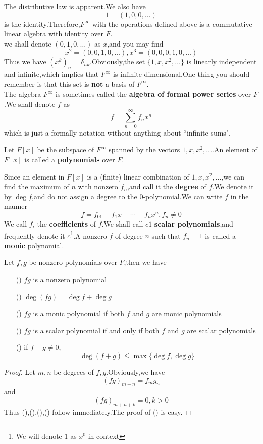 \documentclass{article}
\newcommand{\rmnum}[1]{\romannumeral #1}
\begin{document}
The distributive law is apparent.We also have
\[1=(1,0,0,\dots)\]
is the identity.Therefore,$F^\infty$ with the operations defined above is a commutative linear algebra with identity over $F$.\\
we shall denote $(0,1,0,\dots)$ as $x$,and you may find
\[x^2=(0,0,1,0,\dots),x^3=(0,0,0,1,0,\dots)\]
Thus we have $(x^k)_n=\delta_{nk}$.Obviously,the set $\{1,x,x^2,\dots\}$ is linearly independent and infinite,which implies that $F^\infty$ is infinite-dimensional.One thing you should remember is that this set is \textbf{not} a basis of $F^\infty$.\\
\indent The algebra $F^\infty$ is sometimes called the \textbf{algebra of formal power series} over $F$.We shall denote $f$ as
\[f=\sum\limits_{n=0}^\infty f_nx^n\]
which is just a formally notation without anything about ``infinite sums". 
\begin{dde}
	Let $F[x]$ be the subspace of $F^\infty$ spanned by the vectors $1,x,x^2,\dots$.An element of $F[x]$ is called a \textbf{polynomials} over $F$.
\end{dde}
Since an element in $F[x]$ is a (finite) linear combination of $1,x,x^2,\dots$,we can find the maximum of $n$ with nonzero $f_n$,and call it the \textbf{degree} of $f$.We denote it by $\deg f$,and do not assign a degree to the $0$-polynomial.We can write $f$ in the manner
\[f=f_01+f_1x+\cdots+f_nx^n,f_n\neq0\]
We call $f_i$ the \textbf{coefficients} of $f$.We shall call $c1$ \textbf{scalar polynomials},and frequently denote it $c$\footnote{We will denote $1$ as $x^0$ in context}.A nonzero $f$ of degree $n$ such that $f_n=1$ is called a \textbf{monic} polynomial.
\begin{thm}
	Let $f,g$ be nonzero polynomials over $F$,then we have
	\begin{enumerate}
		\item [(\rmnum{1})]$fg$ is a nonzero polynomial
		\item [(\rmnum{2})]$\deg (fg)=\deg f+\deg g$
		\item [(\rmnum{3})]$fg$ is a monic polynomial if both $f$ and $g$ are monic polynomials
		\item [(\rmnum{4})]$fg$ is a scalar polynomial if and only if both $f$ and $g$ are scalar polynomials
		\item [(\rmnum{5})]if $f+g\neq0$,
		\[\deg (f+g)\le\max\{\deg f,\deg g\}\]
	\end{enumerate}
\end{thm}
\begin{proof}
	Let $m,n$ be degrees of $f,g$.Obviously,we have
	\[(fg)_{m+n}=f_mg_n\]
	and
	\[(fg)_{m+n+k}=0,k>0\]
	Thus (\rmnum{1}),(\rmnum{2}),(\rmnum{3}),(\rmnum{4}) follow immediately.The proof of (\rmnum{5}) is easy.
\end{proof}
\end{document}
